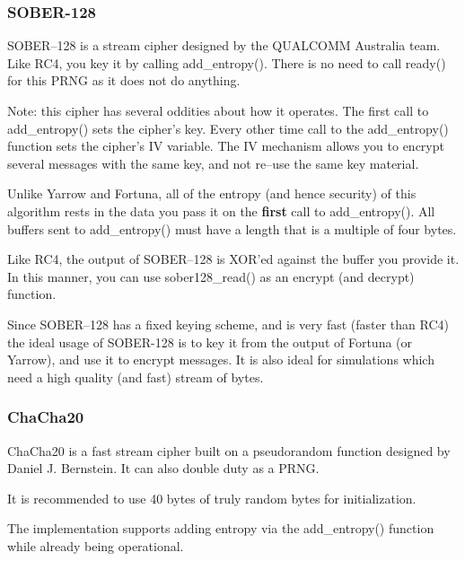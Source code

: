 \documentclass[synpaper]{book}
\begin{document}
\subsubsection{SOBER-128}

SOBER--128 is a stream cipher designed by the QUALCOMM Australia team.  Like RC4, you key it by
calling add\_entropy().  There is no need to call ready() for this PRNG as it does not do anything.

Note: this cipher has several oddities about how it operates.  The first call to add\_entropy() sets the cipher's key.
Every other time call to the add\_entropy() function sets the cipher's IV variable.  The IV mechanism allows you to
encrypt several messages with the same key, and not re--use the same key material.

Unlike Yarrow and Fortuna, all of the entropy (and hence security) of this algorithm rests in the data
you pass it on the \textbf{first} call to add\_entropy().  All buffers sent to add\_entropy() must have a length
that is a multiple of four bytes.

Like RC4, the output of SOBER--128 is XOR'ed against the buffer you provide it.  In this manner, you can use
sober128\_read() as an encrypt (and decrypt) function.

Since SOBER--128 has a fixed keying scheme, and is very fast (faster than RC4) the ideal usage of SOBER-128 is to
key it from the output of Fortuna (or Yarrow), and use it to encrypt messages.  It is also ideal for
simulations which need a high quality (and fast) stream of bytes.

\subsubsection{ChaCha20}

ChaCha20 is a fast stream cipher built on a pseudorandom function designed by Daniel J. Bernstein.
It can also double duty as a PRNG.

It is recommended to use 40 bytes of truly random bytes for initialization.

The implementation supports adding entropy via the add\_entropy() function while already being operational.
\end{document}
